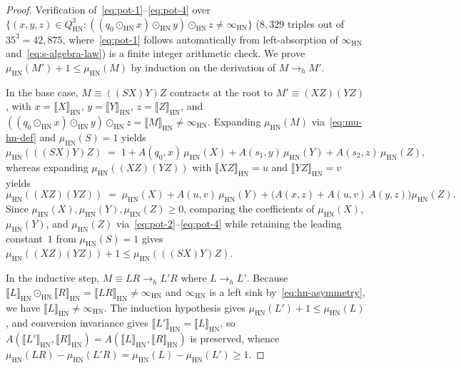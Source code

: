 \documentclass[11pt,reqno]{amsart}
\numberwithin{equation}{section}
\theoremstyle{plain}
\theoremstyle{definition}
\theoremstyle{remark}
\newcommand{\HN}{\mathrm{HN}}
\newcommand{\sem}[1]{\llbracket #1 \rrbracket}
\begin{document}
\begin{proof}
Verification of~\eqref{eq:pot-1}--\eqref{eq:pot-4} over $\{ (x, y, z) \in Q_{\HN}^3 : ((q_0 \odot_{\HN} x) \odot_{\HN} y) \odot_{\HN} z \neq \infty_{\HN} \}$ ($8{,}329$ triples out of $35^3 = 42{,}875$, where~\eqref{eq:pot-1} follows automatically from left-absorption of $\infty_{\HN}$ and~\eqref{eq:s-algebra-law}) is a finite integer arithmetic check. We prove $\mu_{\HN}(M') + 1 \le \mu_{\HN}(M)$ by induction on the derivation of $M \to_h M'$.

In the base case, $M \equiv ((S X) Y) Z$ contracts at the root to $M' \equiv (X Z)(Y Z)$, with $x = \sem{X}_{\HN}$, $y = \sem{Y}_{\HN}$, $z = \sem{Z}_{\HN}$, and $((q_0 \odot_{\HN} x) \odot_{\HN} y) \odot_{\HN} z = \sem{M}_{\HN} \neq \infty_{\HN}$. Expanding $\mu_{\HN}(M)$ via~\eqref{eq:mu-hn-def} and $\mu_{\HN}(S) = 1$ yields
\[
\mu_{\HN}(((S X) Y) Z)
\;=\; 1 + A(q_0, x)\,\mu_{\HN}(X) + A(s_1, y)\,\mu_{\HN}(Y) + A(s_2, z)\,\mu_{\HN}(Z),
\]
whereas expanding $\mu_{\HN}((X Z)(Y Z))$ with $\sem{X Z}_{\HN} = u$ and $\sem{Y Z}_{\HN} = v$ yields
\[
\mu_{\HN}((X Z)(Y Z))
\;=\; \mu_{\HN}(X) + A(u, v)\,\mu_{\HN}(Y) + \bigl(A(x, z) + A(u, v)\,A(y, z)\bigr)\mu_{\HN}(Z).
\]
Since $\mu_{\HN}(X), \mu_{\HN}(Y), \mu_{\HN}(Z) \ge 0$, comparing the coefficients of $\mu_{\HN}(X)$, $\mu_{\HN}(Y)$, and $\mu_{\HN}(Z)$ via~\eqref{eq:pot-2}--\eqref{eq:pot-4} while retaining the leading constant~$1$ from $\mu_{\HN}(S) = 1$ gives $\mu_{\HN}((X Z)(Y Z)) + 1 \le \mu_{\HN}(((S X) Y) Z)$.

In the inductive step, $M \equiv L R \to_h L' R$ where $L \to_h L'$. Because $\sem{L}_{\HN} \odot_{\HN} \sem{R}_{\HN} = \sem{L R}_{\HN} \neq \infty_{\HN}$ and $\infty_{\HN}$ is a left sink by~\eqref{eq:hn-asymmetry}, we have $\sem{L}_{\HN} \neq \infty_{\HN}$. The induction hypothesis gives $\mu_{\HN}(L') + 1 \le \mu_{\HN}(L)$, and conversion invariance gives $\sem{L'}_{\HN} = \sem{L}_{\HN}$, so $A(\sem{L'}_{\HN}, \sem{R}_{\HN}) = A(\sem{L}_{\HN}, \sem{R}_{\HN})$ is preserved, whence $\mu_{\HN}(L R) - \mu_{\HN}(L' R) = \mu_{\HN}(L) - \mu_{\HN}(L') \ge 1$.
\end{proof}
\end{document}
